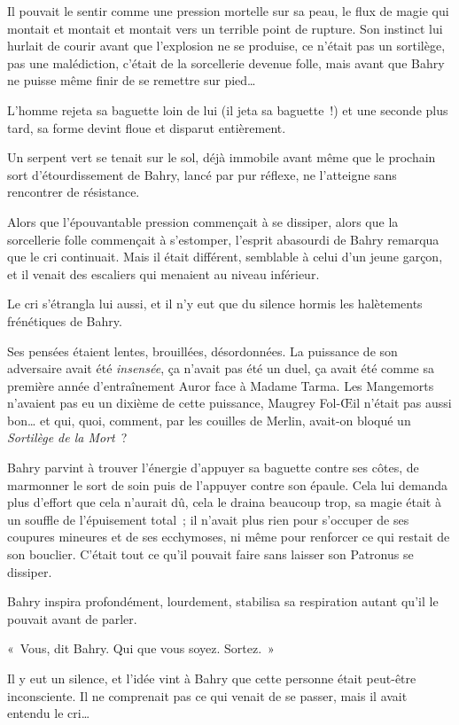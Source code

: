 Il pouvait le sentir comme une pression mortelle sur sa peau, le flux de magie qui montait et montait et montait vers un terrible point de rupture. Son instinct lui hurlait de courir avant que l'explosion ne se produise, ce n'était pas un sortilège, pas une malédiction, c'était de la sorcellerie devenue folle, mais avant que Bahry ne puisse même finir de se remettre sur pied…

L'homme rejeta sa baguette loin de lui (il jeta sa baguette~!) et une seconde plus tard, sa forme devint floue et disparut entièrement.

Un serpent vert se tenait sur le sol, déjà immobile avant même que le prochain sort d'étourdissement de Bahry, lancé par pur réflexe, ne l'atteigne sans rencontrer de résistance.

Alors que l'épouvantable pression commençait à se dissiper, alors que la sorcellerie folle commençait à s'estomper, l'esprit abasourdi de Bahry remarqua que le cri continuait. Mais il était différent, semblable à celui d'un jeune garçon, et il venait des escaliers qui menaient au niveau inférieur.

Le cri s'étrangla lui aussi, et il n'y eut que du silence hormis les halètements frénétiques de Bahry.

Ses pensées étaient lentes, brouillées, désordonnées. La puissance de son adversaire avait été \emph{insensée}, ça n'avait pas été un duel, ça avait été comme sa première année d'entraînement Auror face à Madame Tarma. Les Mangemorts n'avaient pas eu un dixième de cette puissance, Maugrey Fol-Œil n'était pas aussi bon… et qui, quoi, comment, par les couilles de Merlin, avait-on bloqué un \emph{Sortilège de la Mort}~?

Bahry parvint à trouver l'énergie d'appuyer sa baguette contre ses côtes, de marmonner le sort de soin puis de l'appuyer contre son épaule. Cela lui demanda plus d'effort que cela n'aurait dû, cela le draina beaucoup trop, sa magie était à un souffle de l'épuisement total~; il n'avait plus rien pour s'occuper de ses coupures mineures et de ses ecchymoses, ni même pour renforcer ce qui restait de son bouclier. C'était tout ce qu'il pouvait faire sans laisser son Patronus se dissiper.

Bahry inspira profondément, lourdement, stabilisa sa respiration autant qu'il le pouvait avant de parler.

«~Vous, dit Bahry. Qui que vous soyez. Sortez.~»

Il y eut un silence, et l'idée vint à Bahry que cette personne était peut-être inconsciente. Il ne comprenait pas ce qui venait de se passer, mais il avait entendu le cri…

